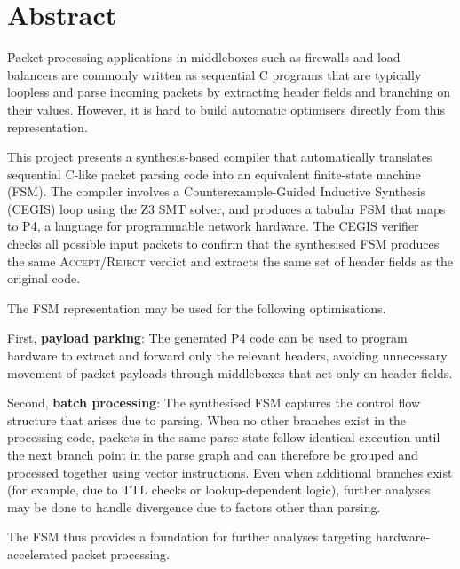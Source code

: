 \chapter*{\center \Large  Abstract}
Packet-processing applications in middleboxes such as firewalls and load
balancers are commonly written as sequential C programs that are typically loopless and parse incoming
packets by extracting header fields and branching on their values. However, it is hard to build automatic optimisers directly from this representation.


This project presents a synthesis-based compiler that automatically
translates sequential C-like packet parsing code into an equivalent
finite-state machine (FSM). The compiler involves a
Counterexample-Guided Inductive Synthesis (CEGIS) loop using the Z3 SMT
solver, and produces a tabular FSM that maps to P4,
a language for programmable network hardware. The CEGIS verifier checks all possible input packets to confirm that the synthesised FSM produces the same \textsc{Accept}/\textsc{Reject} verdict and extracts the same set of header fields as the original code.


The FSM representation may be used for the following optimisations.

First, \textbf{payload parking}: The generated P4 code can be used to 
program hardware to extract and forward only the relevant headers,
avoiding unnecessary movement of packet payloads through middleboxes that
act only on header fields. 

Second, \textbf{batch processing}: The synthesised FSM captures the control flow structure that arises due to parsing. When no other branches exist in the processing code, packets in the same parse state follow identical execution until the next branch point in the parse graph and can therefore be grouped and processed together using vector instructions. Even when additional branches exist (for example, due to TTL checks or lookup-dependent logic), further analyses may be done to handle divergence due to factors other than parsing.

The FSM thus provides a foundation for further analyses targeting hardware-accelerated packet processing.




